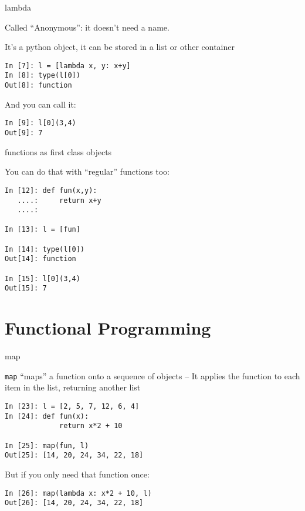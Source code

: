 \documentclass{beamer}
\begin{document}
\begin{frame}[fragile]{lambda}

{\Large Called ``Anonymous'': it doesn't need a name.}

\vfill
{\Large It's a python object, it can be stored in a list or other container}

\vfill
\begin{verbatim}
In [7]: l = [lambda x, y: x+y]
In [8]: type(l[0])
Out[8]: function
\end{verbatim}

\vfill
{\Large And you can call it:}

\vfill
\begin{verbatim}
In [9]: l[0](3,4)
Out[9]: 7
\end{verbatim}

\end{frame} 


\begin{frame}[fragile]{functions as first class objects}

{\Large You can do that with ``regular'' functions too:}

\vfill
\begin{verbatim}
In [12]: def fun(x,y):
   ....:     return x+y
   ....: 

In [13]: l = [fun]

In [14]: type(l[0])
Out[14]: function

In [15]: l[0](3,4)
Out[15]: 7
\end{verbatim}

\end{frame} 

\section{Functional Programming}

\begin{frame}[fragile]{map}

{\Large \verb|map| ``maps'' a function onto a sequence of objects --
It applies the function to each item in the list, returning another list}

\begin{verbatim}
In [23]: l = [2, 5, 7, 12, 6, 4]
In [24]: def fun(x):
             return x*2 + 10

In [25]: map(fun, l)
Out[25]: [14, 20, 24, 34, 22, 18]
\end{verbatim}

{\Large But if you only need that function once:}
\begin{verbatim}
In [26]: map(lambda x: x*2 + 10, l)
Out[26]: [14, 20, 24, 34, 22, 18]
\end{verbatim}

\end{frame} 
\end{document}
